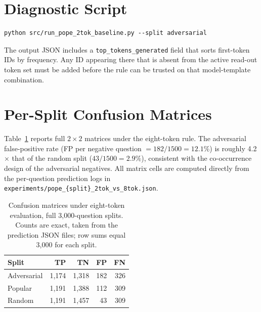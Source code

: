 \documentclass[11pt,letterpaper]{article}
\begin{document}
\section{Diagnostic Script}
\label{app:diagnostic}

\begin{verbatim}
python src/run_pope_2tok_baseline.py --split adversarial
\end{verbatim}
The output JSON includes a \texttt{top\_tokens\_generated} field that
sorts first-token IDs by frequency. Any ID appearing there that is
absent from the active read-out token set must be added before the rule
can be trusted on that model-template combination.

\section{Per-Split Confusion Matrices}
\label{app:confusion}

Table~\ref{tab:confusion} reports full $2 \times 2$ matrices under the
eight-token rule. The adversarial false-positive rate (FP per negative
question $= 182/1500 = 12.1\%$) is roughly 4.2$\times$ that of the
random split ($43/1500 = 2.9\%$), consistent with the co-occurrence
design of the adversarial negatives. All matrix cells are computed
directly from the per-question prediction logs in
\texttt{experiments/pope\_\{split\}\_2tok\_vs\_8tok.json}.

\begin{table}[h]
\caption{Confusion matrices under eight-token evaluation, full
3{,}000-question splits. Counts are exact, taken from the prediction
JSON files; row sums equal 3{,}000 for each split.}
\label{tab:confusion}
\centering
\begin{tabular}{lrrrr}
\toprule
Split & TP & TN & FP & FN \\
\midrule
Adversarial & 1{,}174 & 1{,}318 & 182 & 326 \\
Popular     & 1{,}191 & 1{,}388 & 112 & 309 \\
Random      & 1{,}191 & 1{,}457 &  43 & 309 \\
\bottomrule
\end{tabular}
\end{table}
\end{document}
